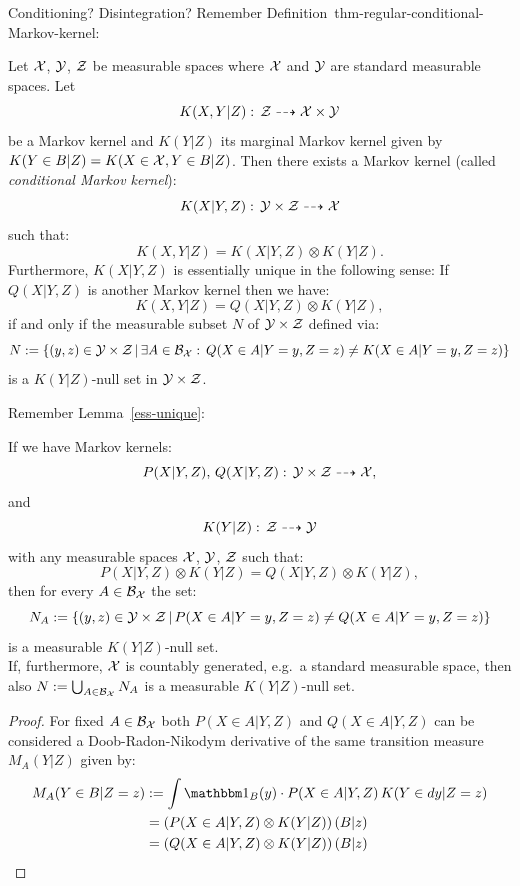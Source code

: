 \begin{Con}
  Conditioning? Disintegration?
  Remember Definition~{thm-regular-conditional-Markov-kernel}:
\begin{DefThm}
    Let $\mathcal{X}$, $\mathcal{Y}$, $\mathcal{Z}$ be measurable spaces where $\mathcal{X}$ and $\mathcal{Y}$ are standard measurable spaces.
    Let 
    \[ K(X,Y|Z):\, \mathcal{Z} \dashrightarrow \mathcal{X} \times \mathcal{Y}\]
    be a Markov kernel and $K(Y|Z)$ its marginal Markov kernel given by $K(Y\in B|Z) = K(X \in \mathcal{X}, Y \in B|Z)$.
    Then there exists a Markov kernel (called \emph{conditional Markov kernel}):
    \[ K(X|Y,Z):\, \mathcal{Y} \times \mathcal{Z} \dashrightarrow \mathcal{X}\]
    such that:
    \[   K(X,Y|Z) = K(X|Y,Z) \otimes K(Y|Z).\]
    Furthermore, $K(X|Y,Z)$ is essentially unique in the following sense:
    If $Q(X|Y,Z)$ is another Markov kernel 
    then we have:
    \[ K(X,Y|Z) = Q(X|Y,Z) \otimes K(Y|Z),\]
    if and only if the measurable subset $N$ of $\mathcal{Y} \times \mathcal{Z}$ defined via:
    \[ N:= \left \{ (y,z) \in \mathcal{Y} \times \mathcal{Z} \,|\, \exists A \in \mathcal{B}_{\mathcal{X}}:\, Q(X \in A|Y=y,Z=z) \neq K(X \in A|Y=y,Z=z)\right \}  \]
    is a $K(Y|Z)$-null set in $\mathcal{Y} \times \mathcal{Z}$.
\end{DefThm}
Remember Lemma~\ref{ess-unique}:
\begin{Lem}
    If we have Markov kernels:    
    \[P(X|Y,Z),\,Q(X|Y,Z):\, \mathcal{Y}\times \mathcal{Z} \dashrightarrow \mathcal{X},\]
    and 
    \[K(Y|Z):\,\mathcal{Z} \dashrightarrow \mathcal{Y}\]
    with any measurable spaces $\mathcal{X}$, $\mathcal{Y}$, $\mathcal{Z}$ such that:
    \[ P(X|Y,Z) \otimes K(Y|Z) = Q(X|Y,Z) \otimes K(Y|Z), \]
    then for every $A \in \mathcal{B}_{\mathcal{X}}$ the set:
    \[N_A := \left \{ (y,z) \in \mathcal{Y} \times \mathcal{Z} \,|\, P(X \in A|Y=y,Z=z) \neq Q(X \in A|Y=y,Z=z)\right \}\]
     is a measurable $K(Y|Z)$-null set. \\
     If, furthermore, $\mathcal{X}$ is countably generated, e.g.\ a standard measurable space,
     then also $N := \bigcup_{A \in \mathcal{B}_{\mathcal{X}}} N_A$ is a measurable $K(Y|Z)$-null set.
     \begin{proof}
         For fixed $A \in \mathcal{B}_{\mathcal{X}}$ both $P(X \in A|Y,Z)$ and $Q(X \in A|Y,Z)$ can be considered
         a Doob-Radon-Nikodym derivative of the same transition measure $M_A(Y|Z)$ given by:
         \begin{align*} M_A(Y \in B|Z=z)&:= \int \I_B(y) \cdot P(X \in A|Y,Z)\, K(Y \in dy|Z=z) \\
             & = \lp P(X \in A|Y,Z) \otimes K(Y|Z) \rp(B|z) \\
             & = \lp Q(X \in A|Y,Z) \otimes K(Y|Z) \rp(B|z) \\

\end{align*}
\end{proof}
\end{Lem}
\end{Con}
